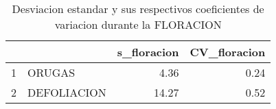 \begin{table}[ht]
\centering
\begin{tabular}{rlrr}
  \hline
 &  & s\_floracion & CV\_floracion \\ 
  \hline
1 & ORUGAS & 4.36 & 0.24 \\ 
  2 & DEFOLIACION & 14.27 & 0.52 \\ 
   \hline
\end{tabular}
\caption{Desviacion estandar y sus
               respectivos coeficientes de variacion
               durante la FLORACION} 
\label{table:stdDevs_flo}
\end{table}
